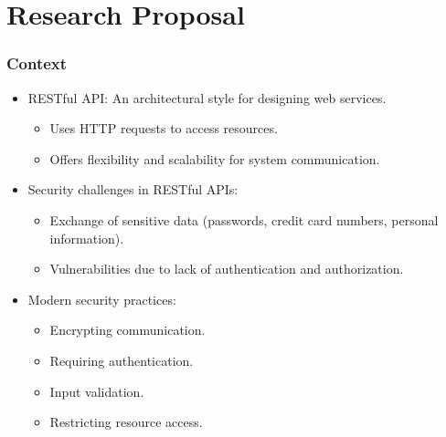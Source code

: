 \documentclass[10pt]{beamer}
\theoremstyle{remark}
\theoremstyle{definition}
\begin{document}
\section{Research Proposal}

\begin{frame}
    \frametitle{Context}
    \begin{itemize}
        \item RESTful API: An architectural style for designing web services.
        \begin{itemize}
            \item Uses HTTP requests to access resources.
            \item Offers flexibility and scalability for system communication.
        \end{itemize}
        \item Security challenges in RESTful APIs:
        \begin{itemize}
            \item Exchange of sensitive data (passwords, credit card numbers, personal information).
            \item Vulnerabilities due to lack of authentication and authorization.
        \end{itemize}
        \item Modern security practices:
        \begin{itemize}
            \item Encrypting communication.
            \item Requiring authentication.
            \item Input validation.
            \item Restricting resource access.
        \end{itemize}
    \end{itemize}
\end{frame}
\end{document}
